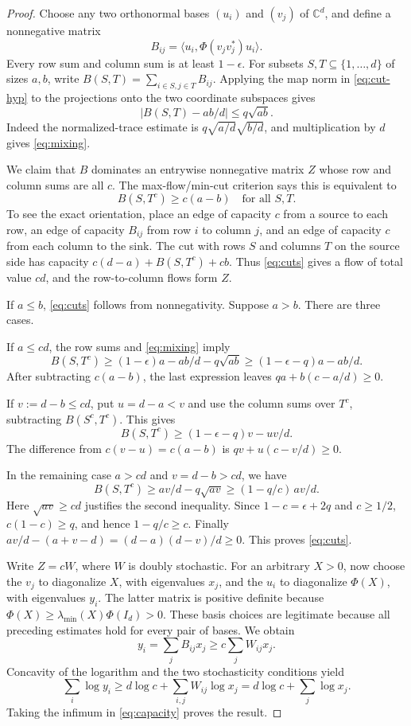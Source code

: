 \documentclass[11pt]{article}
\theoremstyle{remark}
\newcommand{\C}{\mathbb C}
\newcommand{\abs}[1]{\left\lvert#1\right\rvert}
\begin{document}
\begin{proof}
Choose any two orthonormal bases $(u_i)$ and $(v_j)$ of $\C^d$,
and define a nonnegative matrix
\[
 B_{ij}=\langle u_i,\Phi(v_jv_j^*)u_i\rangle.
\]
Every row sum and column sum is at least $1-\epsilon$.
For subsets $S,T\subseteq\{1,\ldots,d\}$ of sizes $a,b$, write
$B(S,T)=\sum_{i\in S,j\in T}B_{ij}$. Applying the map norm in
\eqref{eq:cut-hyp} to the projections onto the two coordinate
subspaces gives
\begin{equation}
 \abs{B(S,T)-ab/d}\leq q\sqrt{ab}. \label{eq:mixing}
\end{equation}
Indeed the normalized-trace estimate is
$q\sqrt{a/d}\sqrt{b/d}$, and multiplication by $d$ gives
\eqref{eq:mixing}.

We claim that $B$ dominates an entrywise nonnegative matrix $Z$
whose row and column sums are all $c$. The max-flow/min-cut
criterion \cite{FF} says this is equivalent to
\begin{equation}
 B(S,T^c)\geq c(a-b) \quad\text{for all $S,T$}. \label{eq:cuts}
\end{equation}
To see the exact orientation, place an edge of capacity $c$
from a source to each row, an edge of capacity $B_{ij}$ from
row $i$ to column $j$, and an edge of capacity $c$ from each
column to the sink. The cut with rows $S$ and columns $T$
on the source side has capacity
$c(d-a)+B(S,T^c)+cb$.
Thus \eqref{eq:cuts} gives a flow of total value $cd$, and
the row-to-column flows form $Z$.

If $a\leq b$, \eqref{eq:cuts} follows from nonnegativity.
Suppose $a>b$. There are three cases.

If $a\leq cd$, the row sums and \eqref{eq:mixing} imply
\[
 B(S,T^c)\geq(1-\epsilon)a-ab/d-q\sqrt{ab}
          \geq(1-\epsilon-q)a-ab/d.
\]
After subtracting $c(a-b)$, the last expression leaves
$qa+b(c-a/d)\geq0$.

If $v:=d-b\leq cd$, put $u=d-a<v$ and use the column sums
over $T^c$, subtracting $B(S^c,T^c)$. This gives
\[
 B(S,T^c)\geq(1-\epsilon-q)v-uv/d.
\]
The difference from $c(v-u)=c(a-b)$ is
$qv+u(c-v/d)\geq0$.

In the remaining case $a>cd$ and $v=d-b>cd$, we have
\[
 B(S,T^c)\geq av/d-q\sqrt{av}
        \geq(1-q/c)\,av/d.
\]
Here $\sqrt{av}\geq cd$ justifies the second inequality.
Since $1-c=\epsilon+2q$ and $c\geq1/2$,
$c(1-c)\geq q$, and hence $1-q/c\geq c$.
Finally
$av/d-(a+v-d)=(d-a)(d-v)/d\geq0$.
This proves \eqref{eq:cuts}.

Write $Z=cW$, where $W$ is doubly stochastic.
For an arbitrary $X>0$, now choose the $v_j$ to diagonalize
$X$, with eigenvalues $x_j$, and the $u_i$ to diagonalize
$\Phi(X)$, with eigenvalues $y_i$.
The latter matrix is positive definite because
$\Phi(X)\geq\lambda_{\min}(X)\Phi(I_d)>0$.
These basis choices are legitimate because all preceding estimates
hold for every pair of bases. We obtain
\[
 y_i=\sum_jB_{ij}x_j\geq c\sum_jW_{ij}x_j.
\]
Concavity of the logarithm and the two stochasticity conditions yield
\[
 \sum_i\log y_i
  \geq d\log c+\sum_{i,j}W_{ij}\log x_j
  =d\log c+\sum_j\log x_j.
\]
Taking the infimum in \eqref{eq:capacity} proves the result.
\end{proof}
\end{document}
